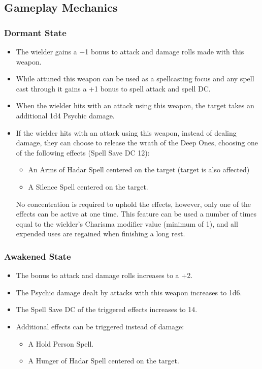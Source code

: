 \subsection*{Gameplay Mechanics}
{\entryfont
\subsubsection*{Dormant State}
\begin{itemize}
	\item The wielder gains a +1 bonus to attack and damage rolls made with this weapon.
	\item While attuned this weapon can be used as a spellcasting focus and any spell cast through it gains a +1 bonus to spell attack and spell DC.
	\item When the wielder hits with an attack using this weapon, the target takes an additional 1d4 Psychic damage.
	\item If the wielder hits with an attack using this weapon, instead of dealing damage, they can choose to release the wrath of the Deep Ones, choosing one of the following effects (Spell Save DC 12):
	\begin{itemize}
		\item An Arms of Hadar Spell centered on the target (target is also affected)
		\item A Silence Spell centered on the target.
	\end{itemize}
	No concentration is required to uphold the effects, however, only one of the effects can be active at one time. This feature can be used a number of times equal to the wielder's Charisma modifier value (minimum of 1), and all expended uses are regained when finishing a long rest.
\end{itemize}
\subsubsection*{Awakened State}
\begin{itemize}
	\item The bonus to attack and damage rolls increases to a +2.
	\item The Psychic damage dealt by attacks with this weapon increases to 1d6.
	\item The Spell Save DC of the triggered effects increases to 14.
	\item Additional effects can be triggered instead of damage:
	\begin{itemize}
		\item A Hold Person Spell.
		\item A Hunger of Hadar Spell centered on the target.
	\end{itemize}
\end{itemize}
}
